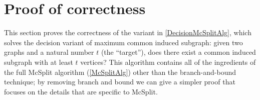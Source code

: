 
\section{Proof of correctness}

This section proves the correctness of the variant in \cref{DecisionMcSplitAlg}, which solves
the decision variant of maximum common induced subgraph: given two graphs and a natural number
$t$ (the ``target''), does there exist a common induced subgraph with at least $t$ vertices?
This algorithm contains all of the ingredients of the full McSplit algorithm (\cref{McSplitAlg})
other than the branch-and-bound technique; by removing branch and bound we can give a simpler
proof that focuses on the details that are specific to McSplit.

